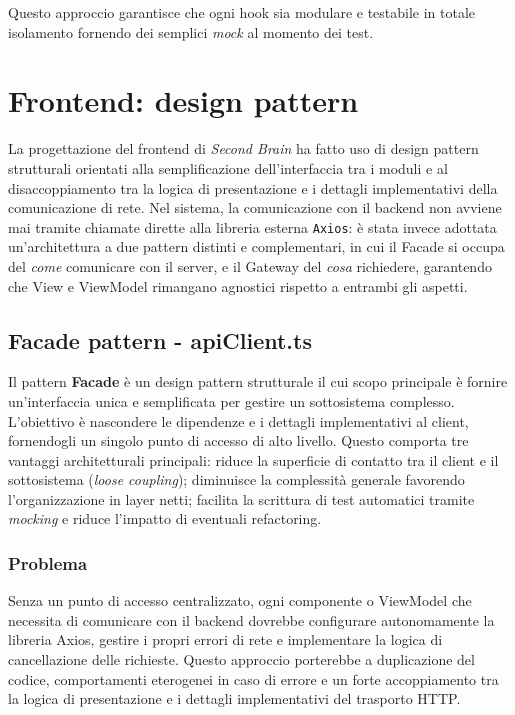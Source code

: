 \documentclass[11pt,a4paper]{article}
\begin{document}
Questo approccio garantisce che ogni hook sia modulare e testabile in totale isolamento fornendo dei semplici \textit{mock} al momento dei test.


\newpage

\section{Frontend: design pattern}
La progettazione del frontend di \textit{Second Brain} ha fatto uso di design pattern strutturali 
orientati alla semplificazione dell'interfaccia tra i moduli e al disaccoppiamento tra la logica 
di presentazione e i dettagli implementativi della comunicazione di rete. Nel sistema, la 
comunicazione con il backend non avviene mai tramite chiamate dirette alla libreria esterna 
\texttt{Axios}: è stata invece adottata un'architettura a due pattern distinti e complementari, 
in cui il Facade si occupa del \textit{come} comunicare con il server, e il Gateway del 
\textit{cosa} richiedere, garantendo che View e ViewModel rimangano agnostici rispetto a 
entrambi gli aspetti.

\subsection{Facade pattern - apiClient.ts}
Il pattern \textbf{Facade} è un design pattern strutturale il cui scopo principale è fornire un'interfaccia unica e semplificata per gestire un sottosistema complesso. L'obiettivo è nascondere le dipendenze e i dettagli implementativi al client, fornendogli un singolo punto di accesso di alto livello. Questo comporta tre vantaggi architetturali principali: riduce la superficie di contatto tra il client e il sottosistema (\textit{loose coupling}); diminuisce la complessità generale favorendo l'organizzazione in layer netti; facilita la scrittura di test automatici tramite \textit{mocking} e riduce l'impatto di eventuali refactoring.

\subsubsection{Problema}
Senza un punto di accesso centralizzato, ogni componente o ViewModel che necessita di comunicare con il backend dovrebbe configurare autonomamente la libreria Axios, gestire i propri errori di rete e implementare la logica di cancellazione delle richieste. Questo approccio porterebbe a duplicazione del codice, comportamenti eterogenei in caso di errore e un forte accoppiamento tra la logica di presentazione e i dettagli implementativi del trasporto HTTP.
\end{document}
